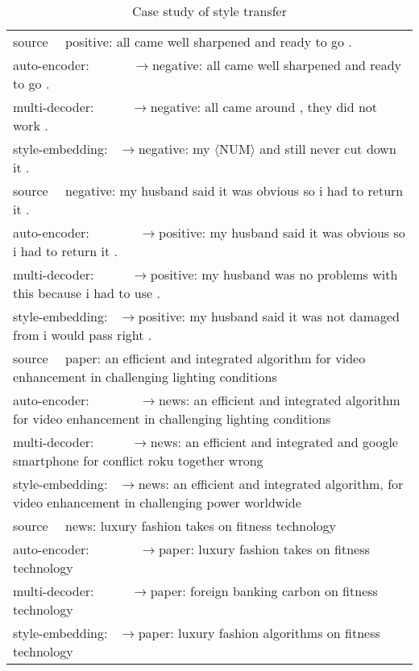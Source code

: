 \documentclass[letterpaper]{article} \usepackage{aaai18}  \usepackage{times}  \usepackage{helvet}  \usepackage{courier}  \usepackage{url}  \usepackage{graphicx}  \usepackage{amsmath}
\begin{document}
\begin{table*}[t]
\centering
\begin{tabular}{l}
\hline
source~~ positive: all came well sharpened and ready to go .                                                             \\
auto-encoder:~~~~~~  $\to$negative: all came well sharpened and ready to go .            \\
multi-decoder:~~~~~  $\to$negative: all came around , they did not work .            \\ 
style-embedding:~  $\to$negative: my $\langle $NUM$ \rangle$ and still never cut down it .       \\ \hline
source~~ negative: my husband said it was obvious so i had to return it .                                                \\
auto-encoder:~~~~~~~  $\to$positive: my husband said it was obvious so i had to return it .              \\
multi-decoder:~~~~~  $\to$positive: my husband was no problems with this because i had to use .       \\ 
style-embedding:~  $\to$positive: my husband said it was not damaged from i would pass right .         \\ \hline
source~~ paper: an efficient and integrated algorithm for video enhancement in challenging lighting conditions          \\ 
auto-encoder:~~~~~~~  $\to$news: an efficient and integrated algorithm for video enhancement in challenging lighting conditions\\
multi-decoder:~~~~~  $\to$news: an efficient and integrated and google smartphone for conflict roku together wrong   \\
style-embedding:~  $\to$news: an efficient and integrated algorithm, for video enhancement in challenging power worldwide \\ \hline
source~~ news: luxury fashion takes on fitness technology                                                      \\
auto-encoder:~~~~~~~  $\to$paper: luxury fashion takes on fitness technology                            \\
multi-decoder:~~~~~ $\to$paper: foreign banking carbon on fitness technology              \\
style-embedding:~  $\to$paper: luxury fashion algorithms on fitness technology          \\ \hline
\end{tabular}
\caption{Case study of style transfer}
\label{table_show_case}
\end{table*}
\end{document}
